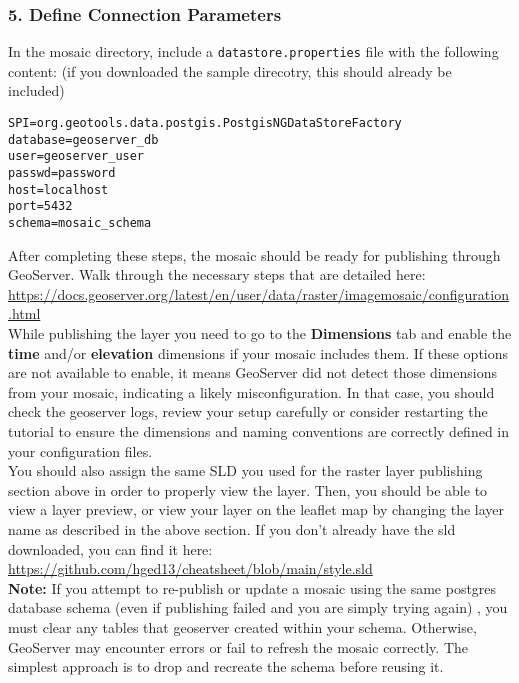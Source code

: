 \documentclass{article}
\begin{document}
\subsubsection*{5. Define Connection Parameters}

In the mosaic directory, include a \texttt{datastore.properties} file with the following content: (if you downloaded the sample direcotry, this should already be included)

\begin{verbatim}
SPI=org.geotools.data.postgis.PostgisNGDataStoreFactory
database=geoserver_db
user=geoserver_user
passwd=password
host=localhost
port=5432
schema=mosaic_schema
\end{verbatim}

After completing these steps, the mosaic should be ready for publishing through GeoServer. Walk through the necessary steps that are detailed here: \url{https://docs.geoserver.org/latest/en/user/data/raster/imagemosaic/configuration.html} \\

While publishing the layer  you need to go to the \textbf{Dimensions} tab and enable the \textbf{time} and/or \textbf{elevation} dimensions if your mosaic includes them. If these options are not available to enable, it means GeoServer did not detect those dimensions from your mosaic, indicating a likely misconfiguration. In that case, you should check the geoserver logs, review your setup carefully or consider restarting the tutorial to ensure the dimensions and naming conventions are correctly defined in your configuration files.  \\


You should also assign the same SLD you used for the raster layer publishing section above in order to properly view the layer. Then, you should be able to view a layer preview, or view your layer on the leaflet map by changing the layer name as described in the above section. If you don't already have the sld downloaded, you can find it here:  \\
\url{https://github.com/hged13/cheatsheet/blob/main/style.sld} \\


\textbf{Note:} If you attempt to re-publish or update a mosaic using the same postgres database schema (even if publishing failed and you are simply trying again) , you must clear any tables that geoserver created within your schema. Otherwise, GeoServer may encounter errors or fail to refresh the mosaic correctly. The simplest approach is to drop and recreate the schema before reusing it. \\
\end{document}
